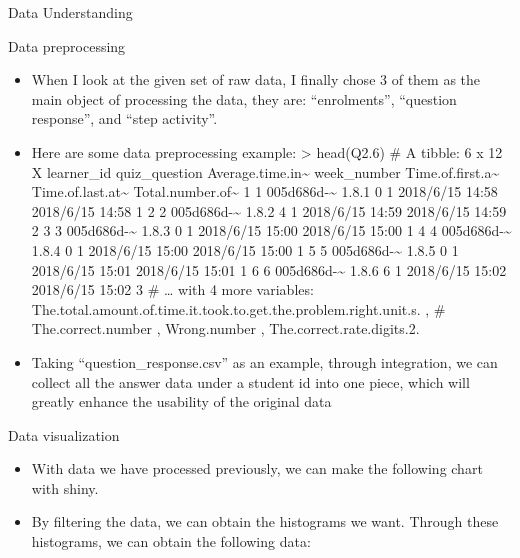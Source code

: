 \documentclass[
  ignorenonframetext,
]{beamer}
\begin{document}
\begin{frame}{Data Understanding}
\begin{block}{Data preprocessing}
\begin{itemize}
\item
  When I look at the given set of raw data, I finally chose 3 of them as
  the main object of processing the data, they are: ``enrolments'',
  ``question response'', and ``step activity''.
\item
  Here are some data preprocessing example: \textgreater{} head(Q2.6) \#
  A tibble: 6 x 12 X learner\_id quiz\_question
  Average.time.in\textasciitilde{} week\_number
  Time.of.first.a\textasciitilde{} Time.of.last.at\textasciitilde{}
  Total.number.of\textasciitilde{} 1 1 005d686d-\textasciitilde{} 1.8.1
  0 1 2018/6/15 14:58 2018/6/15 14:58 1 2 2 005d686d-\textasciitilde{}
  1.8.2 4 1 2018/6/15 14:59 2018/6/15 14:59 2 3 3
  005d686d-\textasciitilde{} 1.8.3 0 1 2018/6/15 15:00 2018/6/15 15:00 1
  4 4 005d686d-\textasciitilde{} 1.8.4 0 1 2018/6/15 15:00 2018/6/15
  15:00 1 5 5 005d686d-\textasciitilde{} 1.8.5 0 1 2018/6/15 15:01
  2018/6/15 15:01 1 6 6 005d686d-\textasciitilde{} 1.8.6 6 1 2018/6/15
  15:02 2018/6/15 15:02 3 \# \ldots{} with 4 more variables:
  The.total.amount.of.time.it.took.to.get.the.problem.right.unit.s. , \#
  The.correct.number , Wrong.number , The.correct.rate.digits.2. 
\item
  Taking ``question\_response.csv'' as an example, through integration,
  we can collect all the answer data under a student id into one piece,
  which will greatly enhance the usability of the original data
\end{itemize}

\end{block}

\end{frame}

\begin{frame}{Data visualization}
\protect\hypertarget{data-visualization}{}

\begin{itemize}
\item
  With data we have processed previously, we can make the following
  chart with shiny.
\item
  By filtering the data, we can obtain the histograms we want. Through
  these histograms, we can obtain the following data:
\end{itemize}

\end{frame}
\end{document}
